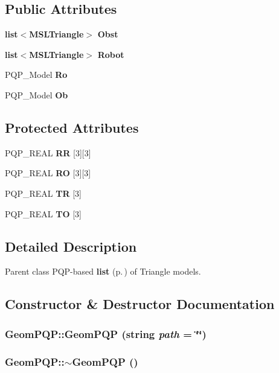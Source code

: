 \subsection*{Public Attributes}
\begin{CompactItemize}
\item 
{\bf list}$<${\bf MSLTriangle}$>$ {\bf Obst}
\item 
{\bf list}$<${\bf MSLTriangle}$>$ {\bf Robot}
\item 
PQP\_\-Model {\bf Ro}
\item 
PQP\_\-Model {\bf Ob}
\end{CompactItemize}
\subsection*{Protected Attributes}
\begin{CompactItemize}
\item 
PQP\_\-REAL {\bf RR} [3][3]
\item 
PQP\_\-REAL {\bf RO} [3][3]
\item 
PQP\_\-REAL {\bf TR} [3]
\item 
PQP\_\-REAL {\bf TO} [3]
\end{CompactItemize}


\subsection{Detailed Description}
Parent class PQP-based {\bf list} {\rm (p.\,\pageref{classlist})} of Triangle models.



\subsection{Constructor \& Destructor Documentation}
\subsubsection{\setlength{\rightskip}{0pt plus 5cm}Geom\-PQP::Geom\-PQP (string {\em path} = \char`\"{}\char`\"{})}\label{classGeomPQP_a0}


\subsubsection{\setlength{\rightskip}{0pt plus 5cm}Geom\-PQP::$\sim$Geom\-PQP ()\hspace{0.3cm}{\tt  [inline, virtual]}}\label{classGeomPQP_a1}




